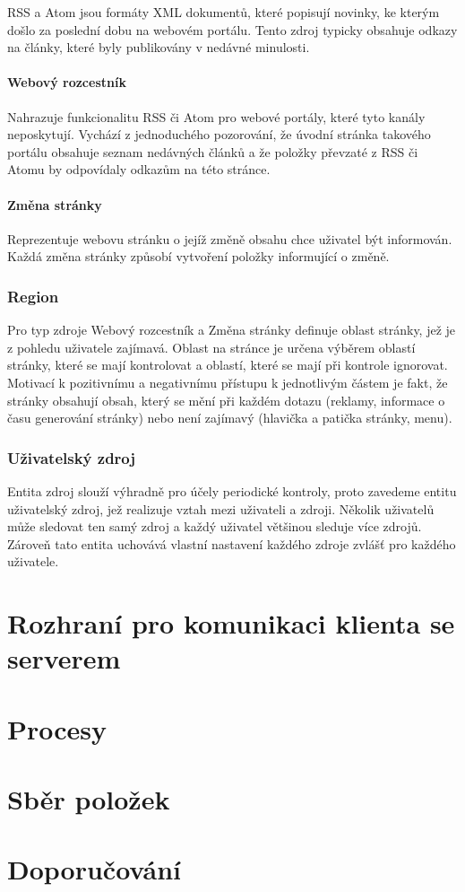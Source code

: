 RSS a Atom jsou formáty XML dokumentů, které popisují novinky, ke kterým došlo za poslední dobu na webovém portálu.
Tento zdroj typicky obsahuje odkazy na články, které byly publikovány v nedávné minulosti.

\paragraph{Webový rozcestník}

Nahrazuje funkcionalitu RSS či Atom pro webové portály, které tyto kanály neposkytují.
Vychází z jednoduchého pozorování, že úvodní stránka takového portálu obsahuje seznam nedávných článků a že položky převzaté z RSS či Atomu by odpovídaly odkazům na této stránce.

\paragraph{Změna stránky}

Reprezentuje webovu stránku o jejíž změně obsahu chce uživatel být informován.
Každá změna stránky způsobí vytvoření položky informující o změně.

\subsubsection{Region}

Pro typ zdroje Webový rozcestník a Změna stránky definuje oblast stránky, jež je z pohledu uživatele zajímavá.
Oblast na stránce je určena výběrem oblastí stránky, které se mají kontrolovat a oblastí, které se mají při kontrole ignorovat.
Motivací k pozitivnímu a negativnímu přístupu k jednotlivým částem je fakt, že stránky obsahují obsah, který se mění při každém dotazu (reklamy, informace o času generování stránky) nebo není zajímavý (hlavička a patička stránky, menu).

\subsubsection{Uživatelský zdroj}

Entita zdroj slouží výhradně pro účely periodické kontroly, proto zavedeme entitu uživatelský zdroj, jež realizuje vztah mezi uživateli a zdroji.
Několik uživatelů může sledovat ten samý zdroj a každý uživatel většinou sleduje více zdrojů.
Zároveň tato entita uchovává vlastní nastavení každého zdroje zvlášť pro každého uživatele.



\section{Rozhraní pro komunikaci klienta se serverem}

\section{Procesy}

\section{Sběr položek}

\section{Doporučování}
